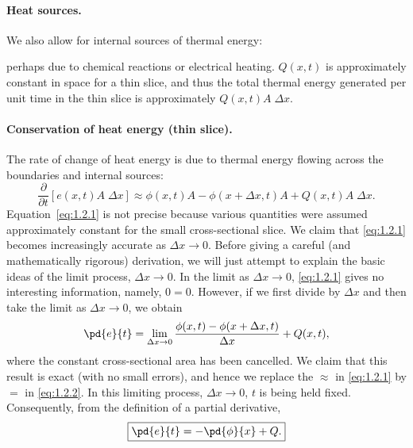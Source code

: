 \paragraph{Heat sources.}
We also allow for internal sources of thermal energy:

\begin{center}
\end{center}

perhaps due to chemical reactions or electrical heating. $Q(x,t)$ is approximately constant in space for a thin slice, and thus the total thermal energy generated per unit time in the thin slice is approximately $Q(x,t) A\;\Delta x$.

\paragraph{Conservation of heat energy (thin slice).}
The rate of change of heat energy is due to thermal energy flowing across the boundaries and internal sources:
\begin{equation}
\frac{\partial}{\partial t}\left[e(x,t) A\;\Delta x\right] \approx \phi(x,t) A - \phi(x + \Delta x, t) A + Q(x,t) A\;\Delta x.
\label{eq:1.2.1}
\end{equation}
Equation~\eqref{eq:1.2.1} is not precise because various quantities were assumed approximately constant for the small cross-sectional slice. We claim that \eqref{eq:1.2.1} becomes increasingly accurate as $\Delta x \to 0$. Before giving a careful (and mathematically rigorous) derivation, we will just attempt to explain the basic ideas of the limit process, $\Delta x \to 0$. In the limit as $\Delta x \to 0$, \eqref{eq:1.2.1} gives no interesting information, namely, $0 = 0$. However, if we first divide by $\Delta x$ and then take the limit as $\Delta x \to 0$, we obtain
\begin{equation}
\pd{e}{t} = \lim_{\Delta x \to 0} \frac{\phi(x,t) - \phi(x + \Delta x, t)}{\Delta x} + Q(x,t),
\label{eq:1.2.2}
\end{equation}
where the constant cross-sectional area has been cancelled. We claim that this result is exact (with no small errors), and hence we replace the $\approx$ in \eqref{eq:1.2.1} by $=$ in \eqref{eq:1.2.2}. In this limiting process, $\Delta x \to 0$, $t$ is being held fixed. Consequently, from the definition of a partial derivative,
\begin{equation}
\boxed{\pd{e}{t} = -\pd{\phi}{x} + Q.}
\label{eq:1.2.3}
\end{equation}

